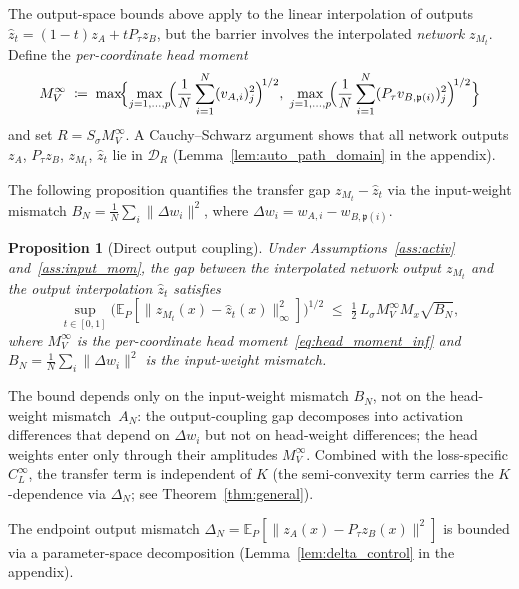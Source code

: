 \documentclass[11pt]{article}
\newtheorem{proposition}[theorem]{Proposition}
\newcommand{\E}{\mathbb{E}}
\newcommand{\cB}{\mathcal{B}}
\newcommand{\cD}{\mathcal{D}}  %
\newcommand{\nperm}{\mathfrak{p}}  %
\begin{document}
The output-space bounds above apply to the linear interpolation of
outputs $\hat z_t = (1-t)z_A + tP_\tau z_B$, but the barrier involves
the interpolated \emph{network} $z_{M_t}$.
Define the \emph{per-coordinate head moment}
\begin{equation}\label{eq:head_moment_inf}
  M_V^\infty \;\coloneqq\;
  \max\!\Bigl\{
    \max_{j=1,\ldots,p}\!\Bigl(\frac{1}{N}\sum_{i=1}^N (v_{A,i})_j^2\Bigr)^{\!1/2},\;
    \max_{j=1,\ldots,p}\!\Bigl(\frac{1}{N}\sum_{i=1}^N (P_\tau v_{B,\nperm(i)})_j^2\Bigr)^{\!1/2}
  \Bigr\}
\end{equation}
and set $R = S_\sigma M_V^\infty$.
A Cauchy--Schwarz argument shows that all network outputs
$z_A$, $P_\tau z_B$, $z_{M_t}$, $\hat z_t$ lie in $\cD_R$
(Lemma~\ref{lem:auto_path_domain} in the appendix).

The following proposition quantifies the transfer gap
$z_{M_t} - \hat z_t$ via the input-weight mismatch
$B_N = \frac{1}{N}\sum_{i} \|\Delta w_i\|^2$,
where $\Delta w_i = w_{A,i} - w_{B,\nperm(i)}$.

\begin{proposition}[Direct output coupling]\label{prop:transfer}
Under Assumptions~\ref{ass:activ} and~\ref{ass:input_mom},
the gap between the interpolated network output $z_{M_t}$ and the
output interpolation $\hat z_t$ satisfies
\begin{equation}\label{eq:transfer}
  \sup_{t\in[0,1]}
  \bigl(\E_P[\|z_{M_t}(x) - \hat z_t(x)\|_\infty^2]\bigr)^{1/2}
  \;\le\; \tfrac{1}{2}\,L_\sigma M_V^\infty M_x \sqrt{B_N},
\end{equation}
where $M_V^\infty$ is the per-coordinate head moment~\eqref{eq:head_moment_inf}
and $B_N = \frac{1}{N}\sum_i \|\Delta w_i\|^2$ is the input-weight mismatch.
\end{proposition}

The bound depends only on the input-weight mismatch $B_N$,
not on the head-weight mismatch~$A_N$:
the output-coupling gap decomposes into activation differences
that depend on $\Delta w_i$ but not on head-weight differences;
the head weights enter only through their amplitudes $M_V^\infty$.
Combined with the loss-specific $C_L^\infty$,
the transfer term is independent of $K$
(the semi-convexity term carries the $K$-dependence
via $\Delta_N$; see Theorem~\ref{thm:general}).

The endpoint output mismatch
$\Delta_N = \E_P[\|z_A(x) - P_\tau z_B(x)\|^2]$ is bounded via
a parameter-space decomposition
(Lemma~\ref{lem:delta_control} in the appendix).
\end{document}
